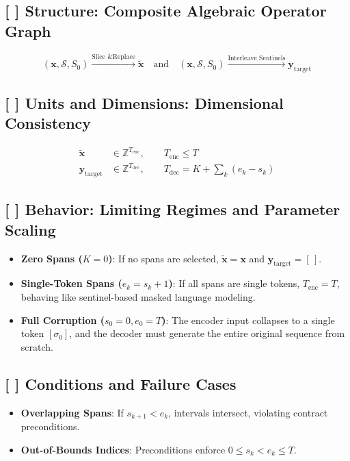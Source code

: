 \documentclass[11pt,a4paper]{article}
\theoremstyle{definition}
\begin{document}
\subsection{[ ] Structure: Composite Algebraic Operator Graph}
{\boldmath
\begin{equation}
(\mathbf{x}, \mathcal{S}, S_0) \xrightarrow{\text{Slice \& Replace}} \tilde{\mathbf{x}} \quad \text{and} \quad (\mathbf{x}, \mathcal{S}, S_0) \xrightarrow{\text{Interleave Sentinels}} \mathbf{y}_{\text{target}}
\end{equation}
}

\subsection{[ ] Units and Dimensions: Dimensional Consistency}
{\boldmath
\begin{align}
\tilde{\mathbf{x}} &\in \mathbb{Z}^{T_{\text{enc}}}, \qquad T_{\text{enc}} \le T \\
\mathbf{y}_{\text{target}} &\in \mathbb{Z}^{T_{\text{dec}}}, \qquad T_{\text{dec}} = K + \sum_k (e_k - s_k)
\end{align}
}

\subsection{[ ] Behavior: Limiting Regimes and Parameter Scaling}
\begin{itemize}
    \item \textbf{Zero Spans ($K = 0$)}: If no spans are selected, $\tilde{\mathbf{x}} = \mathbf{x}$ and $\mathbf{y}_{\text{target}} = [\,]$.
    \item \textbf{Single-Token Spans ($e_k = s_k + 1$)}: If all spans are single tokens, $T_{\text{enc}} = T$, behaving like sentinel-based masked language modeling.
    \item \textbf{Full Corruption ($s_0 = 0, e_0 = T$)}: The encoder input collapses to a single token $[\sigma_0]$, and the decoder must generate the entire original sequence from scratch.
\end{itemize}

\subsection{[ ] Conditions and Failure Cases}
\begin{itemize}
    \item \textbf{Overlapping Spans}: If $s_{k+1} < e_k$, intervals intersect, violating contract preconditions.
    \item \textbf{Out-of-Bounds Indices}: Preconditions enforce $0 \le s_k < e_k \le T$.
\end{itemize}
\end{document}
